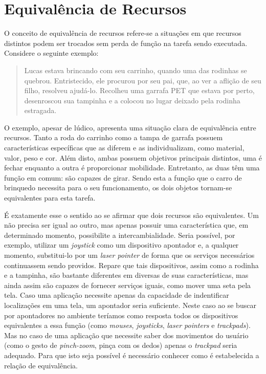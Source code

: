 \section{Equivalência de Recursos}
\label{sec:equivalenciaRecursos}

O conceito de equivalência de recursos refere-se a situações em que recursos distintos podem ser trocados sem perda de função na tarefa sendo executada. Considere o seguinte exemplo:

\begin{quote}
	Lucas estava brincando com seu carrinho, quando uma das rodinhas se quebrou. Entristecido, ele procurou por seu pai, que, ao ver a aflição de seu filho, resolveu ajudá-lo. Recolheu uma garrafa PET que estava por perto, desenroscou sua tampinha e a colocou no lugar deixado pela rodinha estragada.
\end{quote}

O exemplo, apesar de lúdico, apresenta uma situação clara de equivalência entre recursos. Tanto a roda do carrinho como a tampa de garrafa possuem características específicas que as diferem e as individualizam, como material, valor, peso e cor. Além disto, ambas possuem objetivos principais distintos, uma é fechar enquanto a outra é proporcionar mobilidade. Entretanto, as duas têm uma função em comum: são capazes de girar. Sendo esta a função que o carro de brinquedo necessita para o seu funcionamento, os dois objetos tornam-se equivalentes para esta tarefa.

É exatamente esse o sentido ao se afirmar que dois recursos são equivalentes. Um não precisa ser igual ao outro, mas apenas possuir uma característica que, em determinado momento, possibilite a intercambialidade. Seria possível, por exemplo, utilizar um \emph{joystick} como um dispositivo apontador e, a qualquer momento, substitui-lo por um \emph{laser pointer} de forma que os serviços necessários continuassem sendo providos. Repare que tais dispositivos, assim como a rodinha e a tampinha, são bastante diferentes em diversas de suas características, mas ainda assim são capazes de fornecer serviços iguais, como mover uma seta pela tela. Caso uma aplicação necessite apenas da capacidade de indentificar localizações em uma tela, um apontador seria suficiente. Neste caso ao se buscar por apontadores no ambiente teríamos como resposta todos os dispositivos equivalentes a essa função (como \emph{mouses}, \emph{joysticks}, \emph{laser pointers} e \emph{trackpads}). Mas no caso de uma aplicação que necessite saber dos movimentos do usuário (como o gesto de \emph{pinch-zoom}, pinça com os dedos) apenas o \emph{trackpad} seria adequado. Para que isto seja possível é necessário conhecer como é estabelecida a relação de equivalência.

